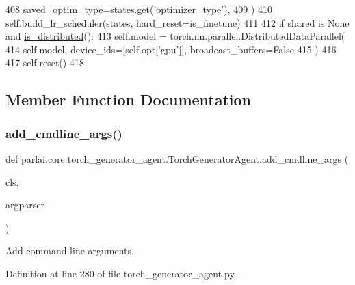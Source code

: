 \begin{DoxyCode}
408                 saved\_optim\_type=states.get(\textcolor{stringliteral}{'optimizer\_type'}),
409             )
410             self.build\_lr\_scheduler(states, hard\_reset=is\_finetune)
411 
412         \textcolor{keywordflow}{if} shared \textcolor{keywordflow}{is} \textcolor{keywordtype}{None} \textcolor{keywordflow}{and} \hyperlink{namespaceparlai_1_1utils_1_1distributed_a023acb5e3b66e1f27e21247c35661279}{is\_distributed}():
413             self.model = torch.nn.parallel.DistributedDataParallel(
414                 self.model, device\_ids=[self.opt[\textcolor{stringliteral}{'gpu'}]], broadcast\_buffers=\textcolor{keyword}{False}
415             )
416 
417         self.reset()
418 
\end{DoxyCode}


\subsection{Member Function Documentation}
\mbox{\label{classparlai_1_1core_1_1torch__generator__agent_1_1TorchGeneratorAgent_ad2e2f6361e46785d0b79e4c5031e5710}} 
\subsubsection{\texorpdfstring{add\+\_\+cmdline\+\_\+args()}{add\_cmdline\_args()}}
{\footnotesize\ttfamily def parlai.\+core.\+torch\+\_\+generator\+\_\+agent.\+Torch\+Generator\+Agent.\+add\+\_\+cmdline\+\_\+args (\begin{DoxyParamCaption}\item[{}]{cls,  }\item[{}]{argparser }\end{DoxyParamCaption})}

\begin{DoxyVerb}Add command line arguments.
\end{DoxyVerb}
 

Definition at line 280 of file torch\+\_\+generator\+\_\+agent.\+py.


